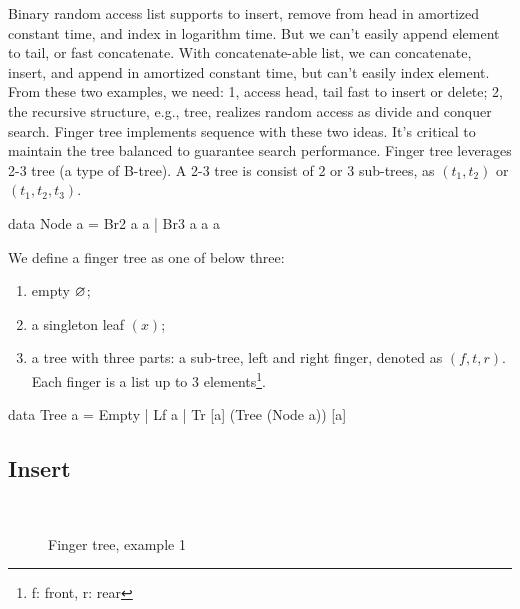 \documentclass[b5paper]{article}
\begin{document}
Binary random access list supports to insert, remove from head in amortized constant time, and index in logarithm time. But we can't easily append element to tail, or fast concatenate. With concatenate-able list, we can concatenate, insert, and append in amortized constant time, but can't easily index element. From these two examples, we need: 1, access head, tail fast to insert or delete; 2, the recursive structure, e.g., tree, realizes random access as divide and conquer search. Finger tree\cite{finger-tree-1977} implements sequence with these two ideas\cite{finger-tree-2006}. It's critical to maintain the tree balanced to guarantee search performance. Finger tree leverages 2-3 tree (a type of B-tree). A 2-3 tree is consist of 2 or 3 sub-trees, as $(t_1, t_2)$ or $(t_1, t_2, t_3)$.

\lstset{frame = single}
\begin{Haskell}
data Node a = Br2 a a | Br3 a a a
\end{Haskell}

We define a finger tree as one of below three:

\begin{enumerate}
\item empty $\varnothing$;
\item a singleton leaf $(x)$;
\item a tree with three parts: a sub-tree, left and right finger, denoted as $(f, t, r)$. Each finger is a list up to 3 elements\footnote{f: front, r: rear}.
\end{enumerate}

\begin{Haskell}
data Tree a = Empty
            | Lf a
            | Tr [a] (Tree (Node a)) [a]
\end{Haskell}

\subsection{Insert}

\begin{figure}[htbp]
  \centering
   \\
  \caption{Finger tree, example 1}
  \label{fig:ftr-example-1}
\end{figure}
\end{document}

